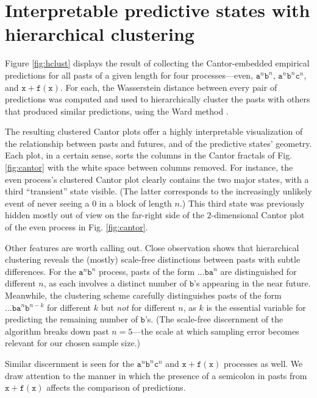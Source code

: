 \documentclass[sigconf, anonymous, review]{acmart}
\begin{document}
\section{Interpretable predictive states with hierarchical clustering}

Figure \ref{fig:hclust} displays the result of collecting the Cantor-embedded
empirical predictions for all pasts of a given length for four processes---even,
$\mathtt{a}^n \mathtt{b}^n$, $\mathtt{a}^n \mathtt{b}^n \mathtt{c}^n$, and
$\mathtt{x+f(x)}$. For each, the Wasserstein distance between every pair of
predictions was computed and used to hierarchically cluster the pasts with
others that produced similar predictions, using the Ward method \cite{Mull11a}.

The resulting clustered Cantor plots offer a highly interpretable visualization
of the relationship between pasts and futures, and of the predictive states'
geometry. Each plot, in a certain sense, sorts the columns in the Cantor
fractals of Fig. \ref{fig:cantor} with the white space between columns removed.
For instance, the even process's clustered Cantor plot clearly contains the two
major states, with a third ``transient'' state visible. (The latter corresponds
to the increasingly unlikely event of never seeing a $0$ in a block of length
$n$.) This third state was previously hidden mostly out of view on the
far-right side of the $2$-dimensional Cantor plot of the even process in Fig.
\ref{fig:cantor}.

Other features are worth calling out. Close observation shows that hierarchical
clustering reveals the (mostly) scale-free distinctions between pasts with
subtle differences. For the $\mathtt{a}^n \mathtt{b}^n$ process, pasts of the
form $\dots \mathtt{b a}^n$ are distinguished for different $n$, as each
involves a distinct number of $\mathtt{b}$'s appearing in the near future.
Meanwhile, the clustering scheme carefully distinguishes pasts of the form
$\dots \mathtt{b a}^n \mathtt{b}^{n-k}$ for different $k$ but \emph{not} for
different $n$, as $k$ is the essential variable for predicting the remaining
number of $\mathtt{b}$'s. (The scale-free discernment of the algorithm breaks
down past $n=5$---the scale at which sampling error becomes relevant for our
chosen sample size.)

Similar discernment is seen for the $\mathtt{a}^n \mathtt{b}^n \mathtt{c}^n$
and $\mathtt{x+f(x)}$ processes as well. We draw attention to the manner in
which the presence of a semicolon in pasts from $\mathtt{x+f(x)}$ affects the
comparison of predictions.
\end{document}
